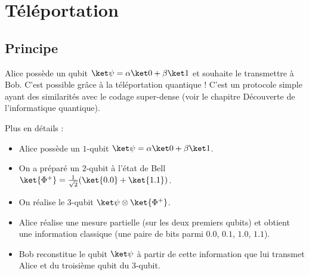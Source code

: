 \documentclass[11pt,class=report,crop=false]{standalone}
\begin{document}












\section{Téléportation}


\subsection{Principe}

Alice possède un qubit $\ket\psi = \alpha \ket0 + \beta\ket1$ et souhaite le transmettre à Bob. C'est possible grâce à la téléportation quantique !
C'est un protocole simple ayant des similarités avec le codage super-dense (voir le chapitre \og{}Découverte de l'informatique quantique\fg{}).

Plus en détails :
\begin{itemize}
  \item Alice possède un $1$-qubit $\ket\psi = \alpha \ket0 + \beta\ket1$.

  \item On a préparé un $2$-qubit à l'état de Bell 
$\ket{\Phi^+} = \frac1{\sqrt2}(\ket{0.0}+\ket{1.1})$.
  
  \item On réalise le $3$-qubit $\ket \psi \otimes \ket {\Phi^+}$.

  \item Alice réalise une mesure partielle (sur les deux premiers qubits) et obtient une information classique (une paire de bits parmi $0.0$, $0.1$, $1.0$, $1.1$).

  \item Bob reconstitue le qubit $\ket\psi$ à partir de cette information que lui transmet Alice et du troisième qubit du $3$-qubit. 

\end{itemize}
\end{document}
